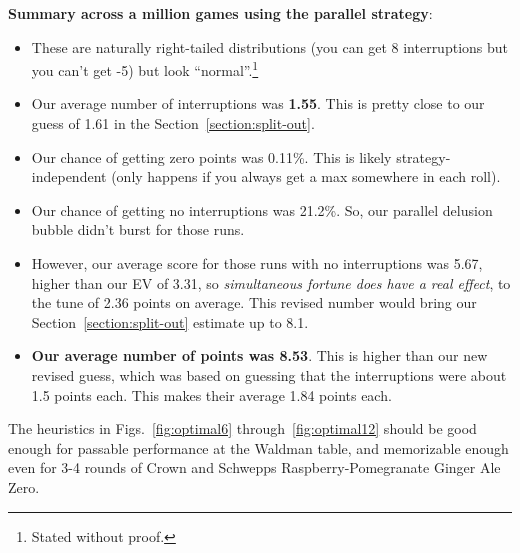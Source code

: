 \documentclass[11pt, oneside]{article} 	%
\begin{document}
\textbf{Summary across a million games using the parallel strategy}:
\begin{itemize}
\item These are naturally right-tailed distributions (you can get 8 interruptions but you can't get -5) but look ``normal''.\footnote{Stated without proof.}
\item Our average number of interruptions was \textbf{1.55}.  This is pretty close to our guess of 1.61 in the Section~\ref{section:split-out}.
\item Our chance of getting zero points was 0.11\%.  This is likely strategy-independent (only happens if you always get a max somewhere in each roll).
\item Our chance of getting no interruptions was 21.2\%.  So, our parallel delusion bubble didn't burst for those runs.
\item However, our average score for those runs with no interruptions was 5.67, higher than our EV of 3.31,  so \emph{simultaneous fortune does have a real effect}, to the tune of 2.36 points on average.  This revised number would bring our Section~\ref{section:split-out} estimate up to 8.1.
\item \textbf{Our average number of points was 8.53}.  This is higher than our new revised guess, which was based on guessing that the interruptions were about 1.5 points each.  This makes their average 1.84 points each.
\end{itemize}

The heuristics in Figs.~\ref{fig:optimal6} through~\ref{fig:optimal12} should be good enough for passable performance at the Waldman table, and memorizable enough even for 3-4 rounds of Crown and Schwepps Raspberry-Pomegranate Ginger Ale Zero.
\end{document}
